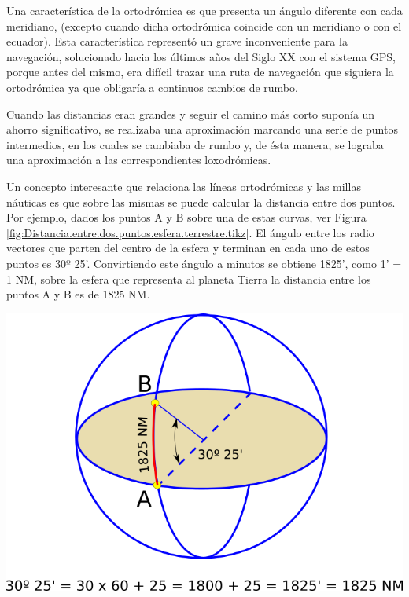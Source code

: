 Una característica de la ortodrómica es que presenta un ángulo diferente con cada meridiano, (excepto cuando dicha ortodrómica coincide con un meridiano o con el ecuador). Esta característica representó un grave inconveniente para la navegación, solucionado hacia los últimos años del Siglo XX con el sistema GPS, porque antes del mismo, era difícil trazar una ruta de navegación que siguiera la ortodrómica ya que obligaría a continuos cambios de rumbo. 

\begin{minipage}[c]{0.5\linewidth}
Cuando las distancias eran grandes y seguir el camino más corto suponía un ahorro significativo, se realizaba una aproximación marcando una serie de puntos intermedios, en los cuales se cambiaba de rumbo y, de ésta manera, se lograba una aproximación a las correspondientes loxodrómicas.

  Un concepto interesante que relaciona las l\'ineas ortodr\'omicas y
  las millas n\'auticas es que sobre las mismas se puede calcular la
  distancia entre dos puntos. Por ejemplo, dados los puntos A y B
  sobre una de estas curvas, ver Figura
  \ref{fig:Distancia.entre.dos.puntos.esfera.terrestre.tikz}.  El
  ángulo entre los radio vectores que parten del centro de la esfera y
  terminan en cada uno de estos puntos es 30º 25'. Convirtiendo este
  \'angulo a minutos se obtiene 1825', como 1' = 1 NM, sobre la esfera
  que representa al planeta Tierra la distancia entre los puntos A y B
  es de 1825 NM.
\end{minipage}\hspace{0.05\linewidth}
\begin{minipage}[c]{0.4\linewidth}
  \begin{center}
    \includegraphics[width=0.9\linewidth]{06.radionavegacion/Imagenes/06.00.navegacion/06_milla_nautica.png}
    \label{fig:Distancia.entre.dos.puntos.esfera.terrestre.tikz}
\end{center}

  \end{minipage}



